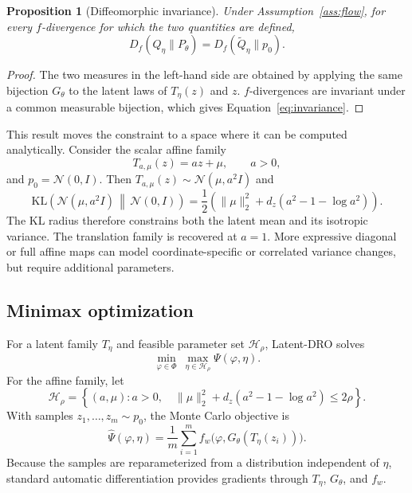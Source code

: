 \documentclass[11pt]{article}
\newtheorem{proposition}{Proposition}
\newcommand{\Phibox}{\Phi}
\newcommand{\design}{\varphi}
\newcommand{\surr}{f_w}
\newcommand{\Div}{D_f}
\begin{document}
\begin{proposition}[Diffeomorphic invariance]
\label{prop:invariance}
Under Assumption~\ref{ass:flow}, for every $f$-divergence for which the two quantities are
defined,
\begin{equation}
  \label{eq:invariance}
  \Div(Q_\eta\|P_\theta)
  = \Div(\widetilde Q_\eta\|p_0).
\end{equation}
\end{proposition}

\begin{proof}
The two measures in the left-hand side are obtained by applying the same bijection
$G_\theta$ to the latent laws of $T_\eta(z)$ and $z$. $f$-divergences are invariant under a
common measurable bijection, which gives Equation~\ref{eq:invariance}.
\end{proof}

This result moves the constraint to a space where it can be computed analytically. Consider
the scalar affine family
\begin{equation}
  \label{eq:affine-transform}
  T_{a,\mu}(z)=az+\mu, \qquad a>0,
\end{equation}
and $p_0=\mathcal{N}(0,I)$. Then $T_{a,\mu}(z)\sim\mathcal{N}(\mu,a^2I)$ and
\begin{equation}
  \label{eq:affine-kl}
  \mathrm{KL}\left(\mathcal{N}(\mu,a^2I)\,\middle\|\,\mathcal{N}(0,I)\right)
  =\frac{1}{2}\left(\|\mu\|_2^2+d_z(a^2-1-\log a^2)\right).
\end{equation}
The KL radius therefore constrains both the latent mean and its isotropic variance. The
translation family is recovered at $a=1$. More expressive diagonal or full affine maps can
model coordinate-specific or correlated variance changes, but require additional parameters.

\subsection{Minimax optimization}

For a latent family $T_\eta$ and feasible parameter set $\mathcal{H}_\rho$, Latent-DRO solves
\begin{equation}
  \label{eq:latent-objective}
  \min_{\design\in\Phibox}\ \max_{\eta\in\mathcal{H}_\rho}
  \Psi(\design,\eta).
\end{equation}
For the affine family, let
\begin{equation}
  \label{eq:affine-feasible}
  \mathcal{H}_\rho=\left\{(a,\mu):a>0,\quad
  \|\mu\|_2^2+d_z(a^2-1-\log a^2)\leq 2\rho\right\}.
\end{equation}
With samples
$z_1,\ldots,z_m\sim p_0$, the Monte Carlo objective is
\begin{equation}
  \label{eq:mc-objective}
  \widehat\Psi(\design,\eta)=\frac{1}{m}\sum_{i=1}^m
  \surr\big(\design,G_\theta(T_\eta(z_i))\big).
\end{equation}
Because the samples are reparameterized from a distribution independent of $\eta$, standard
automatic differentiation provides gradients through $T_\eta$, $G_\theta$, and $\surr$.
\end{document}
